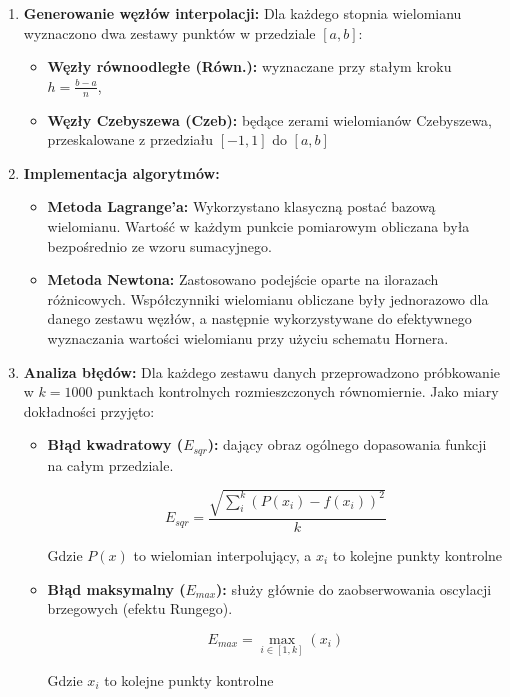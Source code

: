\documentclass{article}
\begin{document}
\begin{enumerate}
    \item \textbf{Generowanie węzłów interpolacji:} Dla każdego stopnia wielomianu wyznaczono dwa zestawy punktów w przedziale $[a, b]$:
    \begin{itemize}
        \item \textbf{Węzły równoodległe (Równ.):} wyznaczane przy stałym kroku $h = \frac{b-a}{n}$,
        \item \textbf{Węzły Czebyszewa (Czeb):} będące zerami wielomianów Czebyszewa, przeskalowane z przedziału $[-1, 1]$ do $[a, b]$
    \end{itemize}
    
    \item \textbf{Implementacja algorytmów:}
    \begin{itemize}
        \item \textbf{Metoda Lagrange'a:} Wykorzystano klasyczną postać bazową wielomianu. Wartość w każdym punkcie pomiarowym obliczana była bezpośrednio ze wzoru sumacyjnego.
        \item \textbf{Metoda Newtona:} Zastosowano podejście oparte na ilorazach różnicowych. Współczynniki wielomianu obliczane były jednorazowo dla danego zestawu węzłów, a następnie wykorzystywane do efektywnego wyznaczania wartości wielomianu przy użyciu schematu Hornera.
    \end{itemize}

    \item \textbf{Analiza błędów:} Dla każdego zestawu danych przeprowadzono próbkowanie w $k=1000$ punktach kontrolnych rozmieszczonych równomiernie. Jako miary dokładności przyjęto:
    \begin{itemize}
        \item \textbf{Błąd kwadratowy ($E_{sqr}$):} dający obraz ogólnego dopasowania funkcji na całym przedziale.
        
        \begin{center}
        \begin{Large}
            \[E_{sqr} = \frac{\sqrt{\sum_{i}^{k}(P(x_{i}) - f(x_{i}))^{2}}}{k}\]
        \end{Large}
        \end{center}  
        
        
        Gdzie $P(x)$ to wielomian interpolujący, a $x_{i}$ to kolejne punkty kontrolne 
        \item \textbf{Błąd maksymalny ($E_{max}$):} służy głównie do zaobserwowania oscylacji brzegowych (efektu Rungego).
        
        \begin{center}
        \begin{Large}
            \[E_{max}=\max_{i\in[1,k]}(x_{i})\]
        \end{Large}
        \end{center}
        
        Gdzie $x_{i}$ to kolejne punkty kontrolne
    \end{itemize}
\end{enumerate}
\end{document}
